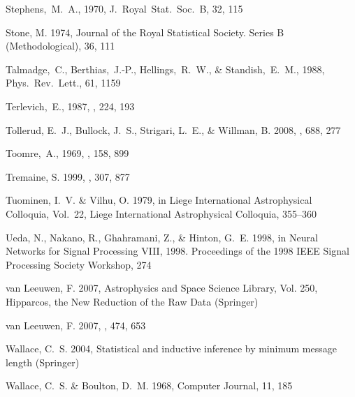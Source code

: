 \begin{thebibliography}{99}
  Stephens,~M.~A., 1970,
  J.~Royal~Stat.~Soc.~B, 32, 115

{Stone}, M. 1974, Journal of the Royal Statistical Society. Series B
  (Methodological), 36, 111

  Talmadge,~C., Berthias,~J.-P., Hellings,~R.~W., \& Standish,~E.~M., 1988,
  Phys.~Rev.~Lett., 61, 1159

  Terlevich,~E., 1987,
  \mnras, 224, 193

{Tollerud}, E.~J., {Bullock}, J.~S., {Strigari}, L.~E., \& {Willman}, B. 2008,
  \apj, 688, 277

  Toomre,~A., 1969,
  \apj, 158, 899

{Tremaine}, S. 1999, \mnras, 307, 877

{Tuominen}, I.~V. \& {Vilhu}, O. 1979, in Liege International Astrophysical
  Colloquia, Vol.~22, Liege International Astrophysical Colloquia, 355--360

{Ueda}, N., {Nakano}, R., {Ghahramani}, Z., \& {Hinton}, G.~E. 1998, in {Neural
  Networks for Signal Processing VIII, 1998. Proceedings of the 1998 IEEE
  Signal Processing Society Workshop}, 274

{van Leeuwen}, F. 2007{}, Astrophysics and Space Science Library,
  Vol. 250, {Hipparcos, the New Reduction of the Raw Data} ({Springer})

{van Leeuwen}, F. 2007{}, \aap, 474, 653

{Wallace}, C.~S. 2004, {Statistical and inductive inference by minimum message
  length} ({Springer})

{Wallace}, C.~S. \& {Boulton}, D.~M. 1968, {Computer Journal}, 11, 185


\end{thebibliography}
